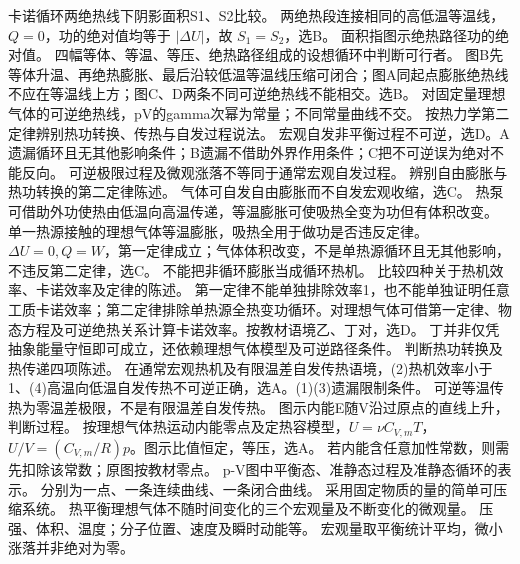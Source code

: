 \problemtext 卡诺循环两绝热线下阴影面积S1、S2比较。
\workings 两绝热段连接相同的高低温等温线，$Q=0$，功的绝对值均等于 $|\Delta U|$，故 $S_1=S_2$，选B。
\crosscheck 面积指图示绝热路径功的绝对值。
\problemtext 四幅等体、等温、等压、绝热路径组成的设想循环中判断可行者。
\workings 图B先等体升温、再绝热膨胀、最后沿较低温等温线压缩可闭合；图A同起点膨胀绝热线不应在等温线上方；图C、D两条不同可逆绝热线不能相交。选B。
\crosscheck 对固定量理想气体的可逆绝热线，pV的gamma次幂为常量；不同常量曲线不交。
\problemtext 按热力学第二定律辨别热功转换、传热与自发过程说法。
\workings 宏观自发非平衡过程不可逆，选D。A遗漏循环且无其他影响条件；B遗漏不借助外界作用条件；C把不可逆误为绝对不能反向。
\crosscheck 可逆极限过程及微观涨落不等同于通常宏观自发过程。
\problemtext 辨别自由膨胀与热功转换的第二定律陈述。
\workings 气体可自发自由膨胀而不自发宏观收缩，选C。
\crosscheck 热泵可借助外功使热由低温向高温传递，等温膨胀可使吸热全变为功但有体积改变。
\problemtext 单一热源接触的理想气体等温膨胀，吸热全用于做功是否违反定律。
\workings $\Delta U=0,Q=W$，第一定律成立；气体体积改变，不是单热源循环且无其他影响，不违反第二定律，选C。
\crosscheck 不能把非循环膨胀当成循环热机。
\problemtext 比较四种关于热机效率、卡诺效率及定律的陈述。
\workings 第一定律不能单独排除效率1，也不能单独证明任意工质卡诺效率；第二定律排除单热源全热变功循环。对理想气体可借第一定律、物态方程及可逆绝热关系计算卡诺效率。按教材语境乙、丁对，选D。
\crosscheck 丁并非仅凭抽象能量守恒即可成立，还依赖理想气体模型及可逆路径条件。
\problemtext 判断热功转换及热传递四项陈述。
\workings 在通常宏观热机及有限温差自发传热语境，(2)热机效率小于1、(4)高温向低温自发传热不可逆正确，选A。(1)(3)遗漏限制条件。
\crosscheck 可逆等温传热为零温差极限，不是有限温差自发传热。
\problemtext 图示内能E随V沿过原点的直线上升，判断过程。
\workings 按理想气体热运动内能零点及定热容模型，$U=\nu C_{V,m}T$，$U/V=(C_{V,m}/R)p$。图示比值恒定，等压，选A。
\crosscheck 若内能含任意加性常数，则需先扣除该常数；原图按教材零点。
\problemtext p-V图中平衡态、准静态过程及准静态循环的表示。
\workings 分别为一点、一条连续曲线、一条闭合曲线。
\crosscheck 采用固定物质的量的简单可压缩系统。
\problemtext 热平衡理想气体不随时间变化的三个宏观量及不断变化的微观量。
\workings 压强、体积、温度；分子位置、速度及瞬时动能等。
\crosscheck 宏观量取平衡统计平均，微小涨落并非绝对为零。

